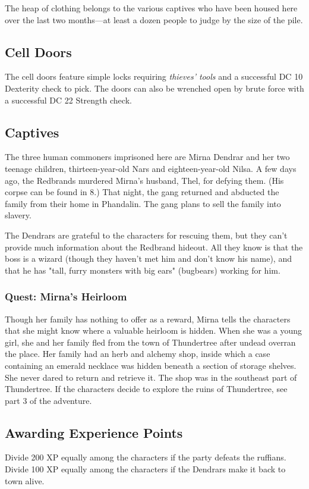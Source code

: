 \documentclass[10pt,a4paper,twoside,bg=print,twocolumn,openany,nodeprecatedcode]{dndbook}
\begin{document}
The heap of clothing belongs to the various captives who have been housed here over the last two months—at least a dozen people to judge by the size of the pile.

\subsection{Cell Doors}
The cell doors feature simple locks requiring \textit{thieves' tools} and a successful DC 10 Dexterity check to pick. The doors can also be wrenched open by brute force with a successful DC 22 Strength check.

\subsection{Captives}
The three human commoners imprisoned here are Mirna Dendrar and her two teenage children, thirteen-year-old Nars and eighteen-year-old Nilsa. A few days ago, the Redbrands murdered Mirna's husband, Thel, for defying them. (His corpse can be found in 8.) That night, the gang returned and abducted the family from their home in Phandalin. The gang plans to sell the family into slavery.

The Dendrars are grateful to the characters for rescuing them, but they can't provide much information about the Redbrand hideout. All they know is that the boss is a wizard (though they haven't met him and don't know his name), and that he has "tall, furry monsters with big ears" (bugbears) working for him.

\subsubsection{Quest: Mirna's Heirloom}
Though her family has nothing to offer as a reward, Mirna tells the characters that she might know where a valuable heirloom is hidden. When she was a young girl, she and her family fled from the town of Thundertree after undead overran the place. Her family had an herb and alchemy shop, inside which a case containing an emerald necklace was hidden beneath a section of storage shelves. She never dared to return and retrieve it. The shop was in the southeast part of Thundertree. If the characters decide to explore the ruins of Thundertree, see part 3 of the adventure.

\subsection{Awarding Experience Points}
Divide 200 XP equally among the characters if the party defeats the ruffians. Divide 100 XP equally among the characters if the Dendrars make it back to town alive.
\end{document}
